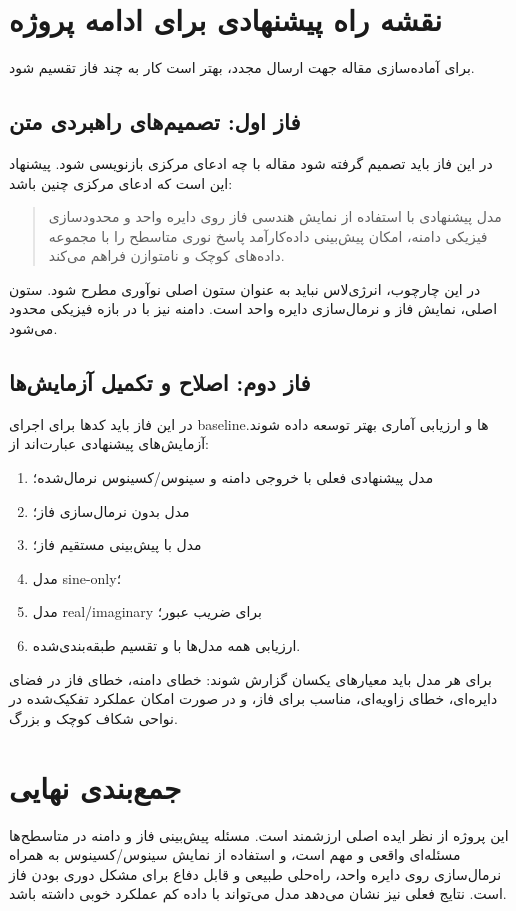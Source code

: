 \section{نقشه راه پیشنهادی برای ادامه پروژه}
برای آماده‌سازی مقاله جهت ارسال مجدد، بهتر است کار به چند فاز تقسیم شود.

\subsection{فاز اول: تصمیم‌های راهبردی متن}
در این فاز باید تصمیم گرفته شود مقاله با چه ادعای مرکزی بازنویسی شود. پیشنهاد این است که ادعای مرکزی چنین باشد:

\begin{quote}
	مدل پیشنهادی با استفاده از نمایش هندسی فاز روی دایره واحد و محدودسازی فیزیکی دامنه، امکان پیش‌بینی داده‌کارآمد پاسخ نوری متاسطح را با مجموعه داده‌های کوچک و نامتوازن فراهم می‌کند.
\end{quote}

در این چارچوب، انرژی‌لاس نباید به عنوان ستون اصلی نوآوری مطرح شود. ستون اصلی، نمایش فاز و نرمال‌سازی دایره واحد است. دامنه نیز با  در بازه فیزیکی محدود می‌شود.

\subsection{فاز دوم: اصلاح و تکمیل آزمایش‌ها}
در این فاز باید کدها برای اجرای baselineها و ارزیابی آماری بهتر توسعه داده شوند. آزمایش‌های پیشنهادی عبارت‌اند از:

\begin{enumerate}
	\item مدل پیشنهادی فعلی با خروجی دامنه و سینوس/کسینوس نرمال‌شده؛
	\item مدل بدون نرمال‌سازی فاز؛
	\item مدل با پیش‌بینی مستقیم فاز؛
	\item مدل sine-only؛
	\item مدل real/imaginary برای ضریب عبور؛
	\item ارزیابی همه مدل‌ها با  و تقسیم طبقه‌بندی‌شده.
\end{enumerate}

برای هر مدل باید معیارهای یکسان گزارش شوند: خطای دامنه، خطای فاز در فضای دایره‌ای، خطای زاویه‌ای،  مناسب برای فاز، و در صورت امکان عملکرد تفکیک‌شده در نواحی شکاف کوچک و بزرگ.


\section{جمع‌بندی نهایی}
این پروژه از نظر ایده اصلی ارزشمند است. مسئله پیش‌بینی فاز و دامنه در متاسطح‌ها مسئله‌ای واقعی و مهم است، و استفاده از نمایش سینوس/کسینوس به همراه نرمال‌سازی روی دایره واحد، راه‌حلی طبیعی و قابل دفاع برای مشکل دوری بودن فاز است. نتایج فعلی نیز نشان می‌دهد مدل می‌تواند با داده کم عملکرد خوبی داشته باشد.

